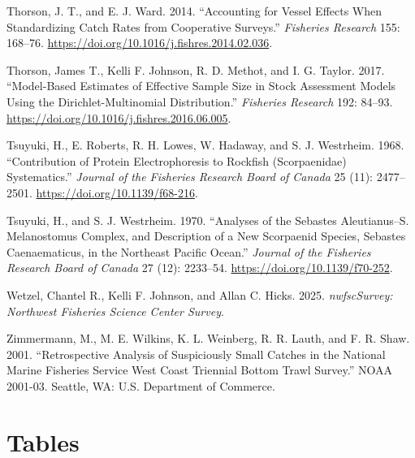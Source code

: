 \documentclass[
]{scrartcl}
\newlength{\cslhangindent}
\newenvironment{CSLReferences}[2] %
 {\begin{list}{}{%
  \setlength{\itemindent}{0pt}
  \setlength{\leftmargin}{0pt}
  \setlength{\parsep}{0pt}
  \ifodd #1
   \setlength{\leftmargin}{\cslhangindent}
   \setlength{\itemindent}{-1\cslhangindent}
  \fi
  \setlength{\itemsep}{#2\baselineskip}}}
 {\end{list}}
\begin{document}
\begin{CSLReferences}{1}{0}
Thorson, J. T., and E. J. Ward. 2014. {``Accounting for Vessel Effects
When Standardizing Catch Rates from Cooperative Surveys.''}
\emph{Fisheries Research} 155: 168--76.
\url{https://doi.org/10.1016/j.fishres.2014.02.036}.

Thorson, James T., Kelli F. Johnson, R. D. Methot, and I. G. Taylor.
2017. {``Model-Based Estimates of Effective Sample Size in Stock
Assessment Models Using the {Dirichlet}-Multinomial Distribution.''}
\emph{Fisheries Research} 192: 84--93.
\url{https://doi.org/10.1016/j.fishres.2016.06.005}.

Tsuyuki, H., E. Roberts, R. H. Lowes, W. Hadaway, and S. J. Westrheim.
1968. {``Contribution of {Protein} {Electrophoresis} to {Rockfish}
({Scorpaenidae}) {Systematics}.''} \emph{Journal of the Fisheries
Research Board of Canada} 25 (11): 2477--2501.
\url{https://doi.org/10.1139/f68-216}.

Tsuyuki, H., and S. J. Westrheim. 1970. {``Analyses of the {Sebastes}
Aleutianus--{S}. Melanostomus {Complex}, and {Description} of a New
{Scorpaenid} {Species}, {Sebastes} Caenaematicus, in the {Northeast}
{Pacific} {Ocean}.''} \emph{Journal of the Fisheries Research Board of
Canada} 27 (12): 2233--54. \url{https://doi.org/10.1139/f70-252}.

Wetzel, Chantel R., Kelli F. Johnson, and Allan C. Hicks. 2025.
\emph{nwfscSurvey: Northwest Fisheries Science Center Survey}.

Zimmermann, M., M. E. Wilkins, K. L. Weinberg, R. R. Lauth, and F. R.
Shaw. 2001. {``Retrospective Analysis of Suspiciously Small Catches in
the {N}ational {M}arine {F}isheries {S}ervice West Coast Triennial
Bottom Trawl Survey.''} NOAA 2001-03. Seattle, WA: {U}.{S}. Department
of Commerce.

\end{CSLReferences}

\newpage{}

\section{Tables}\label{tables}

\begingroup
\fontsize{9.0pt}{10.8pt}\selectfont
\end{document}
